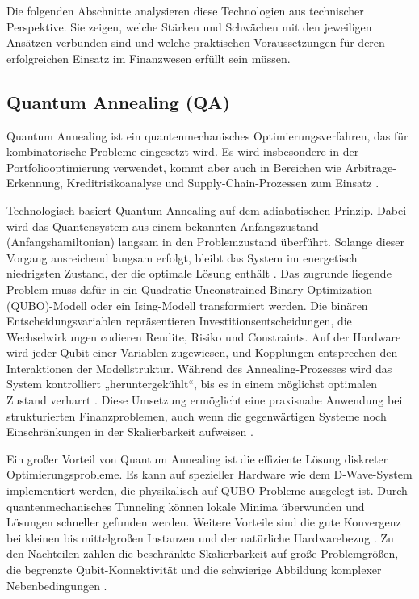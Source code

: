 Die folgenden Abschnitte analysieren diese Technologien aus technischer Perspektive. Sie zeigen, welche Stärken und Schwächen mit den jeweiligen Ansätzen verbunden sind und welche praktischen Voraussetzungen für deren erfolgreichen Einsatz im Finanzwesen erfüllt sein müssen.

\subsection{Quantum Annealing (QA)}

Quantum Annealing ist ein quantenmechanisches Optimierungsverfahren, das für kombinatorische Probleme eingesetzt wird. Es wird insbesondere in der Portfoliooptimierung verwendet, kommt aber auch in Bereichen wie Arbitrage-Erkennung, Kreditrisikoanalyse und Supply-Chain-Prozessen zum Einsatz \cite{orus_quantum_2019, mugel_dynamic_2022}.

Technologisch basiert Quantum Annealing auf dem adiabatischen Prinzip. Dabei wird das Quantensystem aus einem bekannten Anfangszustand (Anfangshamiltonian) langsam in den Problemzustand überführt. Solange dieser Vorgang ausreichend langsam erfolgt, bleibt das System im energetisch niedrigsten Zustand, der die optimale Lösung enthält \cite{Orus2019}. Das zugrunde liegende Problem muss dafür in ein Quadratic Unconstrained Binary Optimization (QUBO)-Modell oder ein Ising-Modell transformiert werden. Die binären Entscheidungsvariablen repräsentieren Investitionsentscheidungen, die Wechselwirkungen codieren Rendite, Risiko und Constraints. Auf der Hardware wird jeder Qubit einer Variablen zugewiesen, und Kopplungen entsprechen den Interaktionen der Modellstruktur. Während des Annealing-Prozesses wird das System kontrolliert „heruntergekühlt“, bis es in einem möglichst optimalen Zustand verharrt \cite{mugel_dynamic_2022, Rosenberg2016}. Diese Umsetzung ermöglicht eine praxisnahe Anwendung bei strukturierten Finanzproblemen, auch wenn die gegenwärtigen Systeme noch Einschränkungen in der Skalierbarkeit aufweisen \cite{sakuler_real-world_2025}.

Ein großer Vorteil von Quantum Annealing ist die effiziente Lösung diskreter Optimierungsprobleme. Es kann auf spezieller Hardware wie dem D-Wave-System implementiert werden, die physikalisch auf QUBO-Probleme ausgelegt ist. Durch quantenmechanisches Tunneling können lokale Minima überwunden und Lösungen schneller gefunden werden. Weitere Vorteile sind die gute Konvergenz bei kleinen bis mittelgroßen Instanzen und der natürliche Hardwarebezug \cite{mugel_dynamic_2022, sakuler_real-world_2025}. Zu den Nachteilen zählen die beschränkte Skalierbarkeit auf große Problemgrößen, die begrenzte Qubit-Konnektivität und die schwierige Abbildung komplexer Nebenbedingungen \cite{sakuler_real-world_2025}.

